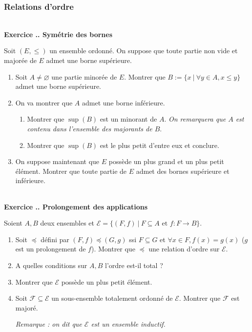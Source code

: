 \documentclass{article}
\newcommand{\mc}[1]{\mathcal{#1}}
\newcounter{exo}
\newcommand{\exercice}[1][\null]{\textbf{\\ Exercice \thesection.\theexo. #1} \addtocounter{exo}{1}}
\begin{document}
\subsubsection{Relations d'ordre}

\exercice[Symétrie des bornes]

Soit $(E, \le)$ un ensemble ordonné. On suppose que toute partie non vide et majorée de $E$ admet une borne supérieure.

\begin{enumerate}

\item Soit $A \neq \varnothing$ une partie minorée de $E$. Montrer que $B := \{x~|~ \forall y \in A, x \le y\}$  admet une borne supérieure.

\item On va montrer que $A$ admet une borne inférieure. 
\begin{enumerate}

\item Montrer que $\sup(B)$ est un minorant de $A$. \emph{On remarquera que $A$ est contenu dans l'ensemble des majorants de $B$}.

\item Montrer que $\sup(B)$ est le plus petit d'entre eux et conclure.

\end{enumerate}

\item On suppose maintenant que $E$ possède un plus grand et un plus petit élément. Montrer que toute partie de $E$ admet des bornes supérieure et inférieure.

\end{enumerate}



\exercice[Prolongement des applications]

Soient $A,B$ deux ensembles et $\mc{E} = \{(F,f)~|~F \subseteq A \text{ et } f : F \rightarrow B\}$.

\begin{enumerate}

\item Soit $\preccurlyeq$ défini par $(F,f) \preccurlyeq (G,g)$ ssi $F \subseteq G$ et $\forall x \in F, f(x) = g(x)$ ($g$ est un prolongement de $f$). Montrer que $\preccurlyeq$ une relation d'ordre sur $\mc{E}$.

\item A quelles conditions sur $A,B$ l'ordre est-il total ?

\item Montrer que $\mc{E}$ possède un plus petit élément.

\item Soit $\mc{F}\subseteq \mc{E}$ un sous-ensemble totalement ordonné de $\mc{E}$. Montrer que $\mc{F}$ est majoré.

\emph{Remarque : on dit que $\mc{E}$ est un ensemble inductif.}

\end{enumerate}
\end{document}
